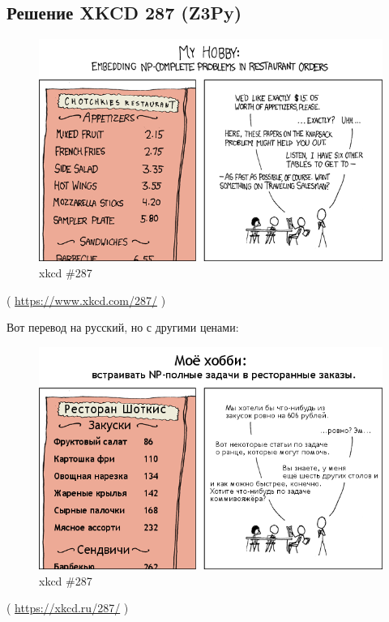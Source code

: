 \subsection{Решение XKCD 287 (Z3Py)}
\label{XkcdILP}

\begin{figure}[H]
\centering
\includegraphics[scale=7]{equations/xkcd287/np_complete.png}
\caption{xkcd \#287}
\end{figure}

( \url{https://www.xkcd.com/287/} )

Вот перевод на русский, но с другими ценами:

\begin{figure}[H]
\centering
\includegraphics[scale=7]{equations/xkcd287/287_v1.png}
\caption{xkcd \#287}
\end{figure}

( \url{https://xkcd.ru/287/} )

